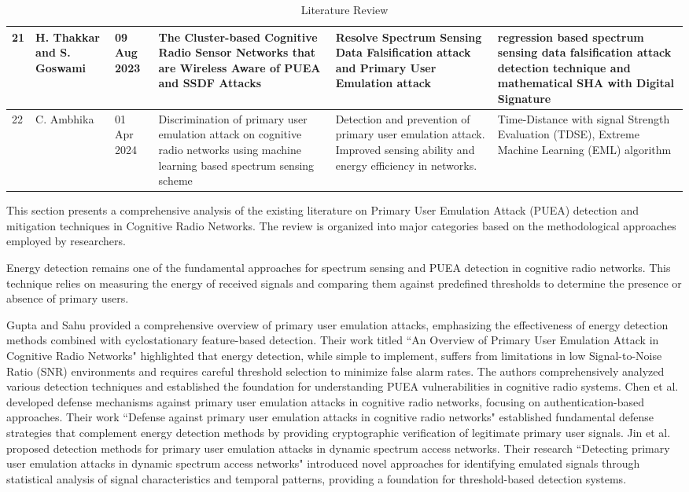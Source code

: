 \begin{table}[]
\begin{tabular}{|p{0.5cm}|p{2.5cm}|p{1.1cm}|p{2.8cm}|p{2.8cm}|p{2.8cm}|}
\hline
21 & H. Thakkar and S. Goswami & 09 Aug 2023 & The Cluster-based Cognitive Radio Sensor Networks that are Wireless Aware of PUEA and SSDF Attacks & Resolve Spectrum Sensing
Data Falsification attack and Primary User Emulation attack & regression based spectrum
sensing data falsification attack detection technique and
mathematical SHA with Digital Signature \\
\hline
22 & C. Ambhika & 01 Apr 2024 & Discrimination of primary user emulation attack on cognitive radio networks using machine learning based spectrum sensing scheme & Detection and prevention of primary user emulation attack.
Improved sensing ability and energy efficiency in networks. & Time-Distance with signal Strength Evaluation (TDSE),
Extreme Machine Learning (EML) algorithm \\
\hline
\end{tabular}
    \caption{Literature Review}
    \label{tab:LR_view2}
\end{table}



This section presents a comprehensive analysis of the existing literature on Primary User Emulation Attack (PUEA) detection and mitigation techniques in Cognitive Radio Networks. The review is organized into major categories based on the methodological approaches employed by researchers.


Energy detection remains one of the fundamental approaches for spectrum sensing and PUEA detection in cognitive radio networks. This technique relies on measuring the energy of received signals and comparing them against predefined thresholds to determine the presence or absence of primary users.

Gupta and Sahu \cite{ref1} provided a comprehensive overview of primary user emulation attacks, emphasizing the effectiveness of energy detection methods combined with cyclostationary feature-based detection. Their work titled ``An Overview of Primary User Emulation Attack in Cognitive Radio Networks" highlighted that energy detection, while simple to implement, suffers from limitations in low Signal-to-Noise Ratio (SNR) environments and requires careful threshold selection to minimize false alarm rates. The authors comprehensively analyzed various detection techniques and established the foundation for understanding PUEA vulnerabilities in cognitive radio systems.
Chen et al. \cite{ref4} developed defense mechanisms against primary user emulation attacks in cognitive radio networks, focusing on authentication-based approaches. Their work ``Defense against primary user emulation attacks in cognitive radio networks" established fundamental defense strategies that complement energy detection methods by providing cryptographic verification of legitimate primary user signals.
Jin et al. \cite{ref6} proposed detection methods for primary user emulation attacks in dynamic spectrum access networks. Their research ``Detecting primary user emulation attacks in dynamic spectrum access networks" introduced novel approaches for identifying emulated signals through statistical analysis of signal characteristics and temporal patterns, providing a foundation for threshold-based detection systems.


